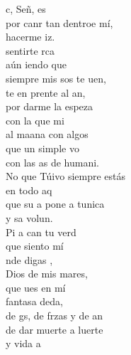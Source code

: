 \documentclass[12pt]{article}
\begin{document}
\begin{multicols*}{2}
\begin{cancion}%
	c, Señ,  es \\
	por canr tan dentroe mí,\\
	 hacerme iz.\\
	 sentirte rca\\
	aún iendo que\\
	siempre mis sos te uen,\\
	te en prente al an,\\
	por darme la espeza  \\
	con la que mi \\
	al maana con algos \\
	que un simple vo\\
	con las as de humani.\\
	No que Túivo siempre estás\\
	en todo aq\\
	que su a pone a tunica\\
	y sa volun.\\
	Pi a can tu verd \\
	que siento  mí\\
	nde digas ,\\
	Dios de mis mares,\\
	que ues en mí\\
	 fantasa deda,\\
	de gs, de frzas y de an\\
	de dar muerte a luerte \\
	y vida a \\

\end{cancion}
\end{multicols*}
\end{document}
